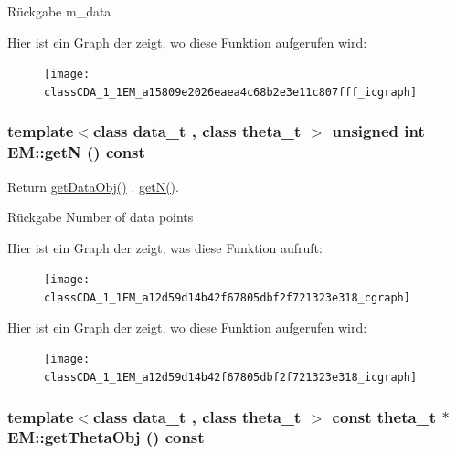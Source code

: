 \begin{DoxyReturn}{Rückgabe}
m\_\-data 
\end{DoxyReturn}


Hier ist ein Graph der zeigt, wo diese Funktion aufgerufen wird:\nopagebreak
\begin{figure}[H]
\begin{center}
\leavevmode
\texttt{[image: classCDA\_1\_1EM\_a15809e2026eaea4c68b2e3e11c807fff\_icgraph]}
\end{center}
\end{figure}


\hypertarget{classCDA_1_1EM_a12d59d14b42f67805dbf2f721323e318}{
\subsubsection[{getN}]{\setlength{\rightskip}{0pt plus 5cm}template$<$class data\_\-t , class theta\_\-t $>$ unsigned int EM::getN () const}}
\label{classCDA_1_1EM_a12d59d14b42f67805dbf2f721323e318}


Return \hyperlink{classCDA_1_1EM_a15809e2026eaea4c68b2e3e11c807fff}{getDataObj()} . \hyperlink{classCDA_1_1EM_a12d59d14b42f67805dbf2f721323e318}{getN()}. 

\begin{DoxyReturn}{Rückgabe}
Number of data points 
\end{DoxyReturn}


Hier ist ein Graph der zeigt, was diese Funktion aufruft:\nopagebreak
\begin{figure}[H]
\begin{center}
\leavevmode
\texttt{[image: classCDA\_1\_1EM\_a12d59d14b42f67805dbf2f721323e318\_cgraph]}
\end{center}
\end{figure}




Hier ist ein Graph der zeigt, wo diese Funktion aufgerufen wird:\nopagebreak
\begin{figure}[H]
\begin{center}
\leavevmode
\texttt{[image: classCDA\_1\_1EM\_a12d59d14b42f67805dbf2f721323e318\_icgraph]}
\end{center}
\end{figure}


\hypertarget{classCDA_1_1EM_aa44545f82da81d3edaee49e34077f58e}{
\subsubsection[{getThetaObj}]{\setlength{\rightskip}{0pt plus 5cm}template$<$class data\_\-t , class theta\_\-t $>$ const theta\_\-t $\ast$ EM::getThetaObj () const}}
\label{classCDA_1_1EM_aa44545f82da81d3edaee49e34077f58e}


